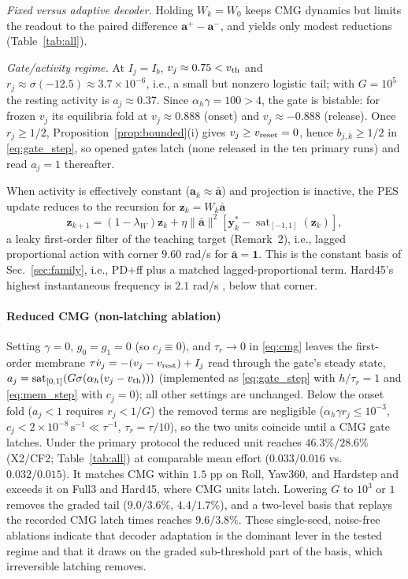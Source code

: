\documentclass[letterpaper, 10 pt, conference]{ieeeconf}
\newcommand{\sat}{\operatorname{sat}}
\begin{document}
\emph{Fixed versus adaptive decoder.} Holding $W_k=W_0$ keeps CMG dynamics but limits the readout to the paired difference $\bm a^+-\bm a^-$, and yields only modest reductions (Table~\ref{tab:all}).

\emph{Gate/activity regime.} At $I_j=I_b$, $v_j\approx0.75<v_{\rm th}$ and $r_j\approx\sigma(-12.5)\approx3.7\times10^{-6}$, i.e., a small but nonzero logistic tail; with $G=10^5$ the resting activity is $a_j\approx0.37$. Since $\alpha_h\gamma=100>4$, the gate is bistable: for frozen $v_j$ its equilibria fold at $v_j\approx0.888$ (onset) and $v_j\approx-0.888$ (release). Once $r_j\ge1/2$, Proposition~\ref{prop:bounded}(i) gives $v_j\ge v_{\rm reset}=0$, hence $b_{j,k}\ge1/2$ in \eqref{eq:gate_step}, so opened gates latch (none released in the ten primary runs) and read $a_j=1$ thereafter.

When activity is effectively constant ($\bm a_k\approx\bar{\bm a}$) and projection is inactive, the PES update reduces to the recursion for $\bm z_k=W_k\bar{\bm a}$
\begin{equation}
 \bm z_{k+1}=(1-\lambda_W)\bm z_k
 +\eta\|\bar{\bm a}\|^2[\bm y_k^*-\sat_{[-1,1]}(\bm z_k)],
 \label{eq:constantbasis}
\end{equation}
a leaky first-order filter of the teaching target (Remark~2), i.e., lagged proportional action with corner $9.60$ rad/s for $\bar{\bm a}=\bm1$. This is the constant basis of Sec.~\ref{sec:family}, i.e., PD+ff plus a matched lagged-proportional term. Hard45's highest instantaneous frequency is $2.1$ rad/s \cite{sandoval2018instantaneous}, below that corner.

\paragraph{Reduced CMG (non-latching ablation)} Setting $\gamma=0$, $g_0=g_1=0$ (so $c_j\equiv0$), and $\tau_r\to0$ in \eqref{eq:cmg} leaves the first-order membrane $\tau\dot v_j=-(v_j-v_{\rm rest})+I_j$ read through the gate's steady state, $a_j=\sat_{[0,1]}(G\sigma(\alpha_h(v_j-v_{\rm th})))$ (implemented as \eqref{eq:gate_step} with $h/\tau_r=1$ and \eqref{eq:mem_step} with $c_j=0$); all other settings are unchanged. Below the onset fold ($a_j<1$ requires $r_j<1/G$) the removed terms are negligible ($\alpha_h\gamma r_j\le10^{-3}$, $c_j<2\times10^{-8}\,\mathrm{s}^{-1}\ll\tau^{-1}$, $\tau_r=\tau/10$), so the two units coincide until a CMG gate latches. Under the primary protocol the reduced unit reaches $46.3\%/28.6\%$ (X2/CF2; Table~\ref{tab:all}) at comparable mean effort ($0.033/0.016$ vs.\ $0.032/0.015$). It matches CMG within $1.5$ pp on Roll, Yaw360, and Hardstep and exceeds it on Full3 and Hard45, where CMG units latch. Lowering $G$ to $10^3$ or $1$ removes the graded tail ($9.0/3.6\%$, $4.4/1.7\%$), and a two-level basis that replays the recorded CMG latch times reaches $9.6/3.8\%$. These single-seed, noise-free ablations indicate that decoder adaptation is the dominant lever in the tested regime and that it draws on the graded sub-threshold part of the basis, which irreversible latching removes.
\end{document}
